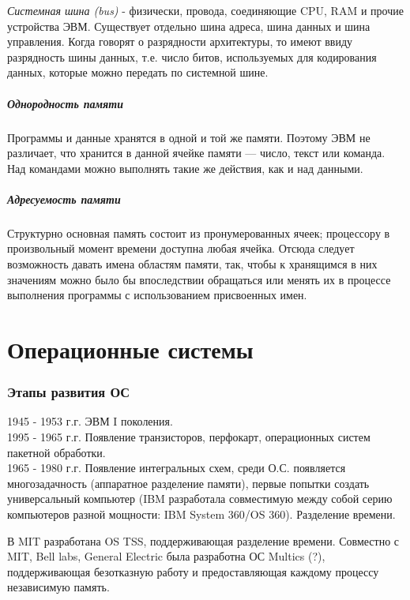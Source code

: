 \documentclass[]{article}
\begin{document}
			\textit{Системная шина (bus)} - физически, провода, соединяющие CPU, RAM и прочие устройства ЭВМ. Существует отдельно шина адреса, шина данных и шина управления. Когда говорят о разрядности архитектуры, то имеют ввиду разрядность шины данных, т.е. число битов, используемых для кодирования данных, которые можно передать по системной шине.
		
		\subsubsection{Однородность памяти}
			Программы и данные хранятся в одной и той же памяти. Поэтому ЭВМ не различает, что хранится в данной ячейке памяти — число, текст или команда. Над командами можно выполнять такие же действия, как и над данными.
			
		\subsubsection {Адресуемость памяти}
			Структурно основная память состоит из пронумерованных ячеек; процессору в произвольный момент времени доступна любая ячейка. Отсюда следует возможность давать имена областям памяти, так, чтобы к хранящимся в них значениям можно было бы впоследствии обращаться или менять их в процессе выполнения программы с использованием присвоенных имен.

\part{Операционные системы}
	\section{Этапы развития ОС}
	1945 - 1953 г.г. ЭВМ I поколения.\\
	1995 - 1965 г.г. Появление транзисторов, перфокарт, операционных систем пакетной обработки.\\
	1965 - 1980 г.г. Появление интегральных схем, среди О.С. появляется многозадачность (аппаратное разделение памяти), первые попытки создать универсальный компьютер (IBM разработала совместимую между собой серию компьютеров разной мощности: IBM System 360/OS 360). Разделение времени.
	
	В MIT разработана OS TSS, поддерживающая разделение времени. Совместно с MIT, Bell labs, General Electric была разработна ОС Multics (?), поддерживающая безотказную работу и предоставляющая каждому процессу независимую память.
	
\end{document}
